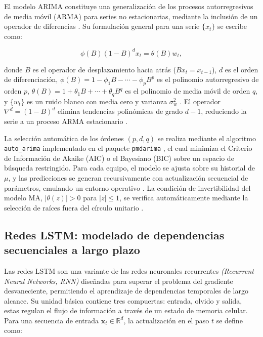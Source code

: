 El modelo ARIMA constituye una generalizaci\'on de los procesos autorregresivos de media m\'ovil (ARMA) para series no estacionarias, mediante la inclusi\'on de un operador de diferencias \cite{brockwell2002,shumway2006}. Su formulaci\'on general para una serie $\{x_t\}$ se escribe como:

\begin{equation}
	\phi(B)(1-B)^d x_t = \theta(B) w_t,
\end{equation}

donde $B$ es el operador de desplazamiento hacia atr\'as ($B x_t = x_{t-1}$), $d$ es el orden de diferenciaci\'on, $\phi(B)=1-\phi_1 B-\cdots-\phi_p B^p$ es el polinomio autorregresivo de orden $p$, $\theta(B)=1+\theta_1 B+\cdots+\theta_q B^q$ es el polinomio de media m\'ovil de orden $q$, y $\{w_t\}$ es un ruido blanco con media cero y varianza $\sigma_w^2$ \cite{shumway2006}. El operador $\nabla^d=(1-B)^d$ elimina tendencias polin\'omicas de grado $d-1$, reduciendo la serie a un proceso ARMA estacionario \cite{HernandezColina}.

La selecci\'on autom\'atica de los \'ordenes $(p,d,q)$ se realiza mediante el algoritmo \texttt{auto\_arima} implementado en el paquete \texttt{pmdarima} \cite{pmdarima2021}, el cual minimiza el Criterio de Informaci\'on de Akaike (AIC) o el Bayesiano (BIC) sobre un espacio de b\'usqueda restringido. Para cada equipo, el modelo se ajusta sobre su historial de $\mu$, y las predicciones se generan recursivamente con actualizaci\'on secuencial de par\'ametros, emulando un entorno operativo \cite{brockwell2002}. La condici\'on de invertibilidad del modelo MA, $|\theta(z)|>0$ para $|z|\le 1$, se verifica autom\'aticamente mediante la selecci\'on de ra\'ices fuera del c\'irculo unitario \cite{shumway2006}.

\subsection{Redes LSTM: modelado de dependencias secuenciales a largo plazo}
\label{ap:lstm_teoria}

Las redes LSTM \cite{hochreiter1997} son una variante de las redes neuronales recurrentes \textit{(Recurrent Neural Networks, RNN)} dise\~nadas para superar el problema del gradiente desvaneciente, permitiendo el aprendizaje de dependencias temporales de largo alcance. Su unidad b\'asica contiene tres compuertas: entrada, olvido y salida, estas regulan el flujo de informaci\'on a trav\'es de un estado de memoria celular. Para una secuencia de entrada $\mathbf{x}_t \in \mathbb{R}^{d}$, la actualizaci\'on en el paso $t$ se define como:

